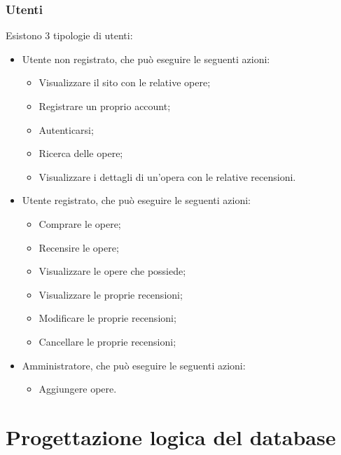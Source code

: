 \documentclass[10pt]{article}
\begin{document}
\subsubsection{Utenti}
Esistono 3 tipologie di utenti:
\begin{itemize}
    \item Utente non registrato, che può eseguire le seguenti azioni:
    \begin{itemize}
        \item Visualizzare il sito con le relative opere;
        \item Registrare un proprio account;
        \item Autenticarsi;
        \item Ricerca delle opere;
        \item Visualizzare i dettagli di un'opera con le relative recensioni.
    \end{itemize}
    \item Utente registrato, che può eseguire le seguenti azioni:
    \begin{itemize}
        \item Comprare le opere;
        \item Recensire le opere;
        \item Visualizzare le opere che possiede;
        \item Visualizzare le proprie recensioni;
        \item Modificare le proprie recensioni;
        \item Cancellare le proprie recensioni;
    \end{itemize}
    \item Amministratore, che può eseguire le seguenti azioni:
    \begin{itemize}
        \item Aggiungere opere.
    \end{itemize}
\end{itemize}

\section{Progettazione logica del database}
\end{document}
